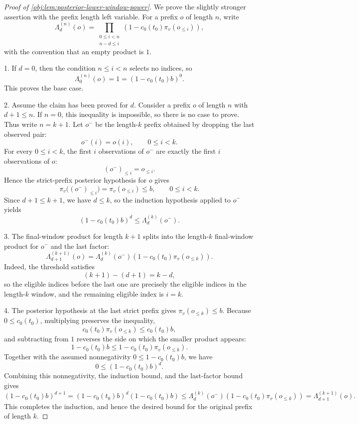 \documentclass[11pt]{article}
\begin{document}
\begin{proof}[Proof of \cref{obj:lem:posterior-lower-window-power}]
We prove the slightly stronger assertion with the prefix length left variable.  For a prefix
\(o\) of length \(n\), write
\[
\Lambda_d^{(n)}(o)
=
\prod_{\substack{0\le i<n\\ n-d\le i}}
\left(1-c_0(t_0)\pi_v(o_{\le i})\right),
\]
with the convention that an empty product is \(1\).

1. If \(d=0\), then the condition \(n\le i<n\) selects no indices, so
\[
\Lambda_0^{(n)}(o)=1=(1-c_0(t_0)b)^0 .
\]
This proves the base case. %

2. Assume the claim has been proved for \(d\).  Consider a prefix \(o\) of length \(n\) with
\(d+1\le n\).  If \(n=0\), this inequality is impossible, so there is no case to prove.  Thus write
\(n=k+1\).  Let \(o^{-}\) be the length-\(k\) prefix obtained by dropping the last observed pair:
\[
o^{-}(i)=o(i),\qquad 0\le i<k .
\]
For every \(0\le i<k\), the first \(i\) observations of \(o^{-}\) are exactly the first \(i\)
observations of \(o\):
\[
(o^{-})_{\le i}=o_{\le i}.
\]
Hence the strict-prefix posterior hypothesis for \(o\) gives
\[
\pi_v\bigl((o^{-})_{\le i}\bigr)=\pi_v(o_{\le i})\le b,
\qquad 0\le i<k .
\]
Since \(d+1\le k+1\), we have \(d\le k\), so the induction hypothesis applied to \(o^{-}\) yields
\[
(1-c_0(t_0)b)^d\le \Lambda_d^{(k)}(o^{-}).
\]

3. The final-window product for length \(k+1\) splits into the length-\(k\) final-window product
for \(o^{-}\) and the last factor:
\[
\Lambda_{d+1}^{(k+1)}(o)
=
\Lambda_d^{(k)}(o^{-})
\left(1-c_0(t_0)\pi_v(o_{\le k})\right).
\]
Indeed, the threshold satisfies
\[
(k+1)-(d+1)=k-d,
\]
so the eligible indices before the last one are precisely the eligible indices in the length-\(k\)
window, and the remaining eligible index is \(i=k\). %

4. The posterior hypothesis at the last strict prefix gives \(\pi_v(o_{\le k})\le b\).  Because
\(0\le c_0(t_0)\), multiplying preserves the inequality,
\[
c_0(t_0)\pi_v(o_{\le k})\le c_0(t_0)b,
\]
and subtracting from \(1\) reverses the side on which the smaller product appears:
\[
1-c_0(t_0)b\le 1-c_0(t_0)\pi_v(o_{\le k}).
\]
Together with the assumed nonnegativity \(0\le 1-c_0(t_0)b\), we have
\[
0\le (1-c_0(t_0)b)^d .
\]
Combining this nonnegativity, the induction bound, and the last-factor bound gives
\[
(1-c_0(t_0)b)^{d+1}
=
(1-c_0(t_0)b)^d(1-c_0(t_0)b)
\le
\Lambda_d^{(k)}(o^{-})
\left(1-c_0(t_0)\pi_v(o_{\le k})\right)
=
\Lambda_{d+1}^{(k+1)}(o).
\]
This completes the induction, and hence the desired bound for the original prefix of length \(k\). %
\end{proof}
\end{document}
